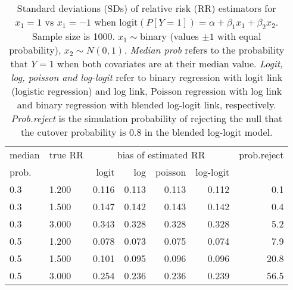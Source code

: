\documentclass[12pt,a4paper]{article}
\begin{document}
\begin{table}[H] 
\small\sf\centering 
\caption{Standard deviations (SDs) of relative risk (RR) estimators for $x_1=1$ vs $x_1=-1$ when $\mbox{logit}(P[Y=1])=\alpha+\beta_1 x_1 + \beta_2 x_2$. Sample size is 1000. $x_1 \sim $binary (values $\pm 1$ with equal probability), $x_2 \sim N(0,1)$. {\it Median prob} refers to the probability that $Y=1$ when both covariates are at their median value. {\it Logit, log, poisson and log-logit} refer to binary regression with logit link (logistic regression) and log link, Poisson regression with log link and binary regression with blended log-logit link, respectively. {\it Prob.reject} is the simulation probability of rejecting the null that the cutover probability is $0.8$ in the blended log-logit model.} 
\begin{tabular}{llrrrrr} 
\toprule 
median & true RR & \multicolumn{4}{c}{bias of estimated RR} & prob.reject \\ 
prob. & & logit & log & poisson & log-logit  & \\ \midrule 
0.3 & 1.200 & 0.116 & 0.113 & 0.113 & 0.112 &  0.1 \\  
0.3 & 1.500 & 0.147 & 0.142 & 0.143 & 0.142 &  0.4 \\  
0.3 & 3.000 & 0.343 & 0.328 & 0.328 & 0.328 &  5.2 \\  
0.5 & 1.200 & 0.078 & 0.073 & 0.075 & 0.074 &  7.9 \\  
0.5 & 1.500 & 0.101 & 0.095 & 0.096 & 0.096 & 20.8 \\  
0.5 & 3.000 & 0.254 & 0.236 & 0.236 & 0.239 & 56.5 \\  
\bottomrule 
\end{tabular} 
\end{table} 
\end{document}
